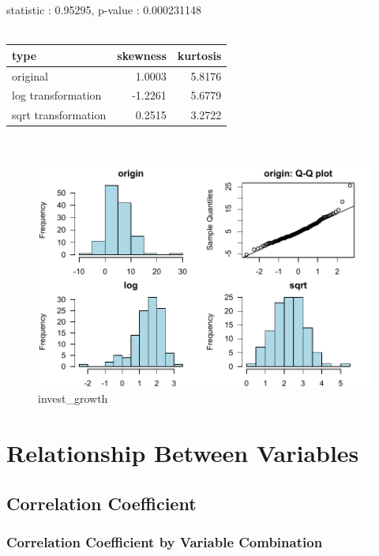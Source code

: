 \documentclass{book}\usepackage[]{graphicx}\usepackage[]{color}
\begin{document}
\noindent statistic : 0.95295,  p-value : 0.000231148\\
\\%
\begin{tabular}{lrr}
  \toprule
type & skewness & kurtosis \\ 
  \midrule
original & 1.0003 & 5.8176 \\ 
  log transformation & -1.2261 & 5.6779 \\ 
  sqrt transformation & 0.2515 & 3.2722 \\ 
   \bottomrule
\end{tabular}
\\
\begin{figure}[!ht]
\centering
\includegraphics[width=1.0\textwidth]{figure/norm12.pdf}
\caption{invest\_growth}
\end{figure}
\clearpage

\chapter{Relationship Between Variables}
\section{Correlation Coefficient}
\subsection{Correlation Coefficient by Variable Combination}
\end{document}
